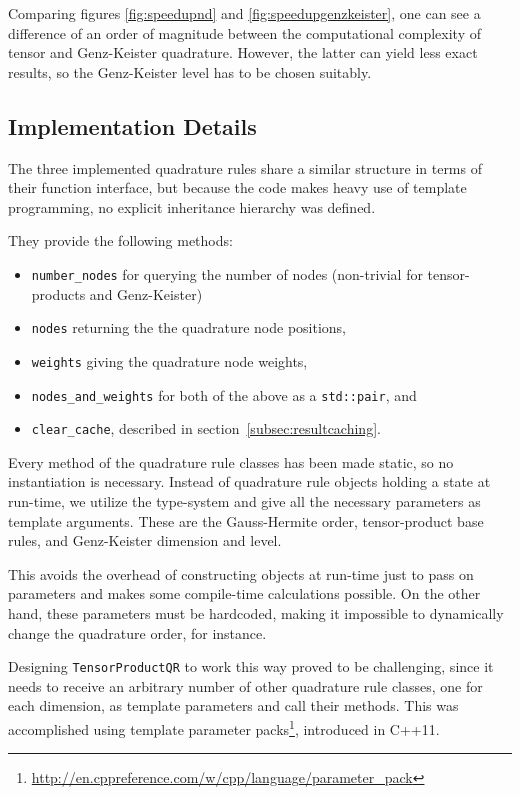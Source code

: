 Comparing figures \ref{fig:speedupnd} and \ref{fig:speedupgenzkeister}, one can
see a difference of an order of magnitude between the computational complexity
of tensor and Genz-Keister quadrature.
However, the latter can yield less exact results, so the Genz-Keister level has
to be chosen suitably.


\subsection{Implementation Details}

The three implemented quadrature rules share a similar structure in terms of
their function interface, but because the code makes heavy use of template
programming, no explicit inheritance hierarchy was defined.

They provide the following methods:
\begin{itemize}
  \item \texttt{number\_nodes} for querying the number of nodes (non-trivial for
    tensor-products and Genz-Keister)
  \item \texttt{nodes} returning the the quadrature node positions,
  \item \texttt{weights} giving the quadrature node weights,
  \item \texttt{nodes\_and\_weights} for both of the above as a
    \texttt{std::pair}, and
  \item \texttt{clear\_cache}, described in section~\ref{subsec:resultcaching}.
\end{itemize}

Every method of the quadrature rule classes has been made static, so no
instantiation is necessary.
Instead of quadrature rule objects holding a state at run-time, we utilize the
type-system and give all the necessary parameters as template arguments.
These are the Gauss-Hermite order, tensor-product base rules, and Genz-Keister
dimension and level.

This avoids the overhead of constructing objects at run-time just to pass on
parameters and makes some compile-time calculations possible.
On the other hand, these parameters must be hardcoded, making it impossible to
dynamically change the quadrature order, for instance.

Designing \texttt{TensorProductQR} to work this way proved to be challenging,
since it needs to receive an arbitrary number of other quadrature rule classes,
one for each dimension, as template parameters and call their methods.
This was accomplished using template parameter
packs\footnote{\url{http://en.cppreference.com/w/cpp/language/parameter_pack}},
introduced in C++11.


